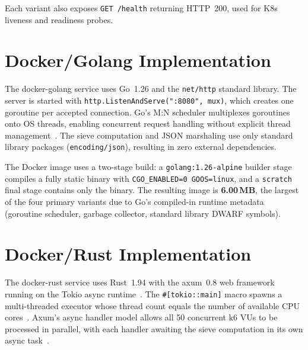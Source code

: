 \begin{sloppypar}
Each variant also exposes \texttt{GET /health} returning \acs{HTTP}~200, used for \acs{K8s} liveness and readiness probes.
\end{sloppypar}

\section{Docker/Golang Implementation}
\label{sec:impl_docker_golang}

\begin{sloppypar}
The docker-golang service uses Go~1.26 and the \texttt{net/http} standard library. The server is started with \texttt{http.ListenAndServe(":8080", mux)}, which creates one goroutine per accepted connection. Go's M:N scheduler multiplexes goroutines onto \acs{OS} threads, enabling concurrent request handling without explicit thread management~\cite{go2024effective}. The sieve computation and \acs{JSON} marshaling use only standard library packages (\texttt{encoding/json}), resulting in zero external dependencies.
\end{sloppypar}

\begin{sloppypar}
The Docker image uses a two-stage build: a \texttt{golang:1.26-alpine} builder stage compiles a fully static binary with \texttt{CGO\_ENABLED=0 GOOS=linux}, and a \texttt{scratch} final stage contains only the binary. The resulting image is \textbf{6.00\,MB}, the largest of the four primary variants due to Go's compiled-in runtime metadata (goroutine scheduler, garbage collector, standard library \acs{DWARF} symbols).
\end{sloppypar}

\section{Docker/Rust Implementation}
\label{sec:impl_docker_rust}

\begin{sloppypar}
The docker-rust service uses Rust~1.94 with the axum~0.8 web framework~\cite{axum2024} running on the Tokio async runtime~\cite{tokio2024runtime}. The \texttt{\#[tokio::main]} macro spawns a multi-threaded executor whose thread count equals the number of available \acs{CPU} cores~\cite{tokio2024runtime}. Axum's async handler model allows all 50 concurrent k6 \acp{VU} to be processed in parallel, with each handler awaiting the sieve computation in its own async task~\cite{axum2024}.
\end{sloppypar}

